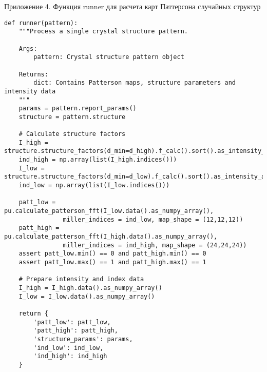 \begin{center}
Приложение 4. Функция runner для расчета карт Паттерсона случайных структур
\end{center}
\begin{verbatim}
def runner(pattern):
    """Process a single crystal structure pattern.
    
    Args:
        pattern: Crystal structure pattern object
        
    Returns:
        dict: Contains Patterson maps, structure parameters and intensity data
    """
    params = pattern.report_params()
    structure = pattern.structure
    
    # Calculate structure factors
    I_high = structure.structure_factors(d_min=d_high).f_calc().sort().as_intensity_array()
    ind_high = np.array(list(I_high.indices()))
    I_low = structure.structure_factors(d_min=d_low).f_calc().sort().as_intensity_array()
    ind_low = np.array(list(I_low.indices()))
    
    patt_low = pu.calculate_patterson_fft(I_low.data().as_numpy_array(),
    			miller_indices = ind_low, map_shape = (12,12,12))
    patt_high = pu.calculate_patterson_fft(I_high.data().as_numpy_array(),
    			miller_indices = ind_high, map_shape = (24,24,24))
    assert patt_low.min() == 0 and patt_high.min() == 0
    assert patt_low.max() == 1 and patt_high.max() == 1
    
    # Prepare intensity and index data
    I_high = I_high.data().as_numpy_array()
    I_low = I_low.data().as_numpy_array()
    
    return {
        'patt_low': patt_low,
        'patt_high': patt_high,
        'structure_params': params,
        'ind_low': ind_low,
        'ind_high': ind_high
    }
\end{verbatim}
\newpage

